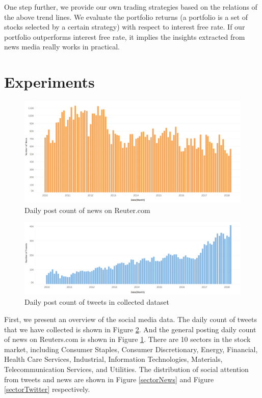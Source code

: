 \documentclass[conference]{IEEEtran}
\begin{document}
One step further, we provide our own trading strategies based on the relations of the above trend lines. We evaluate the portfolio returns (a portfolio is a set of stocks selected by a certain strategy) with respect to interest free rate. If our portfolio outperforms interest free rate, it implies the insights extracted from news media really works in practical.
\vspace{1.0em}

\section{Experiments}\label{Experiments}
\begin{figure}[t]
\centerline{\includegraphics[width=\columnwidth]{pics/reutersImage.png}}
\caption{Daily post count of news on Reuter.com}
\label{reuters}
\end{figure}

\begin{figure}[t]
\centerline{\includegraphics[width=\columnwidth]{pics/twitterImage.png}}
\caption{Daily post count of tweets in collected dataset}
\label{twitter}
\end{figure}


First, we present an overview of the social media data. The daily count of tweets that we have collected is shown in Figure \ref{twitter}. And the general posting daily count of news on Reuters.com is shown in Figure \ref{reuters}. There are 10 sectors in the stock market, including Consumer Staples, Consumer Discretionary, Energy, Financial, Health Care Services, Industrial, Information Technologies, Materials, Telecommunication Services, and Utilities. The distribution of social attention from tweets and news are shown in Figure \ref{sectorNews} and Figure \ref{sectorTwitter} respectively. 
\end{document}
